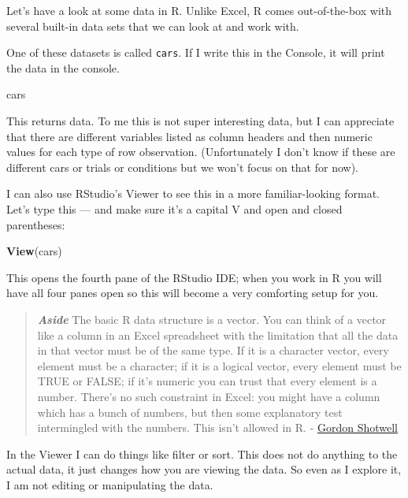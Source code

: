 \documentclass[]{book}
\newenvironment{Shaded}{\begin{snugshade}}{\end{snugshade}}
\newcommand{\KeywordTok}[1]{\textcolor[rgb]{0.13,0.29,0.53}{\textbf{#1}}}
\newcommand{\NormalTok}[1]{#1}
\begin{document}
Let's have a look at some data in R. Unlike Excel, R comes out-of-the-box with several built-in data sets that we can look at and work with.

One of these datasets is called \texttt{cars}. If I write this in the Console, it will print the data in the console.

\begin{Shaded}
\begin{Highlighting}[]
\NormalTok{cars}
\end{Highlighting}
\end{Shaded}

This returns data. To me this is not super interesting data, but I can appreciate that there are different variables listed as column headers and then numeric values for each type of row observation. (Unfortunately I don't know if these are different cars or trials or conditions but we won't focus on that for now).

I can also use RStudio's Viewer to see this in a more familiar-looking format. Let's type this --- and make sure it's a capital V and open and closed parentheses:

\begin{Shaded}
\begin{Highlighting}[]
\KeywordTok{View}\NormalTok{(cars)}
\end{Highlighting}
\end{Shaded}

This opens the fourth pane of the RStudio IDE; when you work in R you will have all four panes open so this will become a very comforting setup for you.

\begin{quote}
\textbf{\emph{Aside}} The basic R data structure is a vector. You can think of a vector like a column in an Excel spreadsheet with the limitation that all the data in that vector must be of the same type. If it is a character vector, every element must be a character; if it is a logical vector, every element must be TRUE or FALSE; if it's numeric you can trust that every element is a number. There's no such constraint in Excel: you might have a column which has a bunch of numbers, but then some explanatory test intermingled with the numbers. This isn't allowed in R. - \href{https://blog.shotwell.ca/posts/r_for_excel_users/}{Gordon Shotwell}
\end{quote}

In the Viewer I can do things like filter or sort. This does not do anything to the actual data, it just changes how you are viewing the data. So even as I explore it, I am not editing or manipulating the data.
\end{document}
